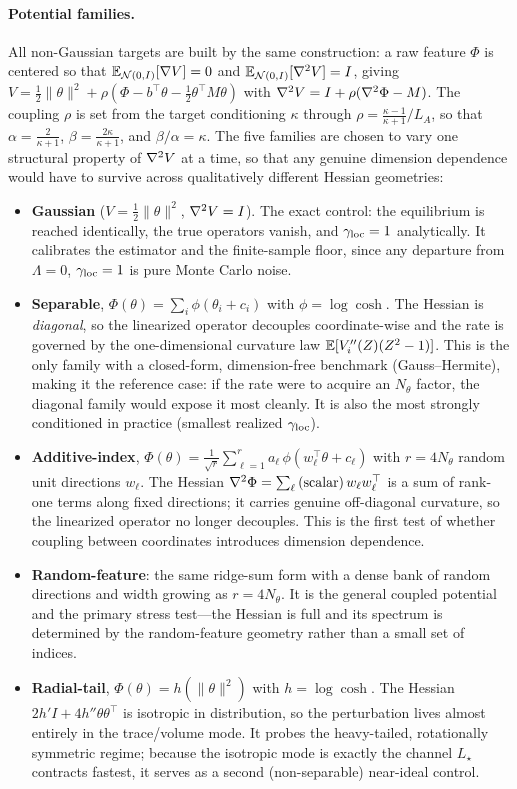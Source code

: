 \documentclass[11pt]{article}
\begin{document}
\paragraph{Potential families.}
All non-Gaussian targets are built by the same construction: a raw feature
$\Phi$ is centered so that $\mathbb{E}_{\mathcal{N}(0,I)}[\nabla V]=0$ and
$\mathbb{E}_{\mathcal{N}(0,I)}[\nabla^2 V]=I$, giving $V=\tfrac12\|\theta\|^2+\rho(\Phi-b^\top\theta-\tfrac12\theta^\top M\theta)$
with $\nabla^2 V=I+\rho(\nabla^2\Phi-M)$. The coupling $\rho$ is set from the target
conditioning $\kappa$ through $\rho=\tfrac{\kappa-1}{\kappa+1}/L_A$, so that
$\alpha=\tfrac{2}{\kappa+1}$, $\beta=\tfrac{2\kappa}{\kappa+1}$, and
$\beta/\alpha=\kappa$. The five families are chosen to vary one structural
property of $\nabla^2 V$ at a time, so that any genuine dimension dependence would
have to survive across qualitatively different Hessian geometries:
\begin{itemize}\itemsep3pt
  \item \textbf{Gaussian} ($V=\tfrac12\|\theta\|^2$, $\nabla^2 V=I$). The exact
  control: the equilibrium is reached identically, the true operators vanish, and
  $\gamma_{\mathrm{loc}}=1$ analytically. It calibrates the estimator and the finite-sample floor,
  since any departure from $\Lambda=0$, $\gamma_{\mathrm{loc}}=1$ is pure Monte Carlo noise.
  \item \textbf{Separable}, $\Phi(\theta)=\sum_i\phi(\theta_i+c_i)$ with
  $\phi=\log\cosh$. The Hessian is \emph{diagonal}, so the linearized operator
  decouples coordinate-wise and the rate is governed by the one-dimensional
  curvature law $\mathbb{E}[V_i''(Z)(Z^2-1)]$. This is the only family with a
  closed-form, dimension-free benchmark (Gauss--Hermite), making it the reference
  case: if the rate were to acquire an $N_\theta$ factor, the diagonal family
  would expose it most cleanly. It is also the most strongly conditioned in
  practice (smallest realized $\gamma_{\mathrm{loc}}$).
  \item \textbf{Additive-index}, $\Phi(\theta)=\tfrac{1}{\sqrt r}\sum_{\ell=1}^{r}a_\ell\,\phi(w_\ell^\top\theta+c_\ell)$
  with $r=4N_\theta$ random unit directions $w_\ell$. The Hessian
  $\nabla^2\Phi=\sum_\ell\text{(scalar)}\,w_\ell w_\ell^\top$ is a sum of rank-one
  terms along fixed directions; it carries genuine off-diagonal curvature, so the
  linearized operator no longer decouples. This is the first test of whether
  coupling between coordinates introduces dimension dependence.
  \item \textbf{Random-feature}: the same ridge-sum form with a dense bank of
  random directions and width growing as $r=4N_\theta$. It is the general
  coupled potential and the primary stress test---the Hessian is full and its
  spectrum is determined by the random-feature geometry rather than a small set
  of indices.
  \item \textbf{Radial-tail}, $\Phi(\theta)=h(\|\theta\|^2)$ with
  $h=\log\cosh$. The Hessian $2h'I+4h''\theta\theta^\top$ is isotropic in
  distribution, so the perturbation lives almost entirely in the trace/volume
  mode. It probes the heavy-tailed, rotationally symmetric regime; because the
  isotropic mode is exactly the channel $L_\star$ contracts fastest, it serves as
  a second (non-separable) near-ideal control.
\end{itemize}
\end{document}
